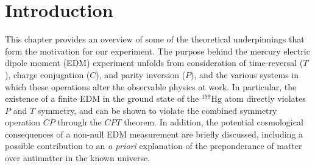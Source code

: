 \documentclass [10pt, twoside] {uwthesis}[2012/04/02]
\begin{document}
\textpages
\renewcommand{\floatpagefraction}{0.75}

\chapter{Introduction}     
This chapter provides an overview of some of the theoretical underpinnings that form the motivation for our experiment. The purpose behind the mercury electric dipole moment (EDM) experiment unfolds from consideration of time-reversal ($T$), charge conjugation ($C$), and parity inversion ($P$), and the various systems in which these operations alter the observable physics at work. In particular, the existence of a finite EDM in the ground state of the $^{199}$Hg atom directly violates $P$ and $T$ symmetry, and can be shown to violate the combined symmetry operation $CP$ through the $CPT$ theorem. In addition, the potential cosmological consequences of a non-null EDM measurement are briefly discussed, including a possible contribution to an \textit{a priori} explanation of the preponderance of matter over antimatter in the known universe.
\end{document}
